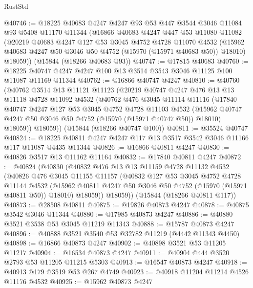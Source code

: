\begin{lexlean}{RustStd}
\begin{coremodule}
@40746 := @18225
    @40683
    @4247
    @4247
    @93
    @53
    @447
    @3544
    @3046
    @11084
    @93
    @5408
    @11170
    @11344
    (@16866
      @40683
      @4247
      @447
      @53
      @11080
      @11082
      (@20219
        @40683
        @4247
        @127
        @53
        @3045
        @4752
        @4728
        @11070
        @4532
        (@15962 @40683 @4247 @50 @3046 @50 @4752 (@15970 (@15971 @40683 @50)) @18010)
        @18059))
    (@15844 (@18266 @40683 @93))
@40747 := @17815 @40683
@40760 := @18225 @40747 @4247 @4247 @100 @13 @3514 @3543 @3046 @11125 @100 @11087 @11169 @11344
@40762 := @16866 @40747 @4247
@40810 := @40760
    (@40762
      @3514
      @13
      @11121
      @11123
      (@20219
        @40747
        @4247
        @476
        @13
        @13
        @11118
        @4728
        @11092
        @4532
        (@40762
          @476
          @3045
          @11114
          @11116
          (@17840
            @40747
            @4247
            @127
            @53
            @3045
            @4752
            @4728
            @11103
            @4532
            (@15962 @40747 @4247 @50 @3046 @50 @4752 (@15970 (@15971 @40747 @50)) @18010)
            @18059))
        @18059))
    (@15844 (@18266 @40747 @100))
@40811 := @35524 @40747
@40824 := @18225 @40811 @4247 @4247 @117 @13 @3517 @3542 @3046 @11166 @117 @11087 @4435 @11344
@40826 := @16866 @40811 @4247
@40830 := @40826 @3517 @13 @11162 @11164
@40832 := @17840 @40811 @4247
@40872 := @40824
    (@40830
      (@40832
        @476
        @13
        @13
        @11159
        @4728
        @11132
        @4532
        (@40826
          @476
          @3045
          @11155
          @11157
          (@40832
            @127
            @53
            @3045
            @4752
            @4728
            @11144
            @4532
            (@15962 @40811 @4247 @50 @3046 @50 @4752 (@15970 (@15971 @40811 @50)) @18010)
            @18059))
        @18059))
    (@15844 (@18266 @40811 @117))
@40873 := @28508 @40811
@40875 := @19826 @40873 @4247
@40878 := @40875 @3542 @3046 @11344
@40880 := @17985 @40873 @4247
@40886 := @40880 @3521 @3538 @53 @3045 @11219 @11343
@40888 := @15787 @40873 @4247
@40896 := @40888 @3521 @3540 @53 @32782 @11219 (@4442 @11343 @4450)
@40898 := @16866 @40873 @4247
@40902 := @40898 @3521 @53 @11205 @11217
@40904 := @16534 @40873 @4247
@40911 := @40904 @444 @3520 @2793 @53 @11205 @11215 @5303
@40913 := @16547 @40873 @4247
@40918 := @40913 @179 @3519 @53 @267 @4749
@40923 := @40918 @11204 @11214 @4526 @11176 @4532
@40925 := @15962 @40873 @4247

\end{coremodule}
\end{lexlean}

